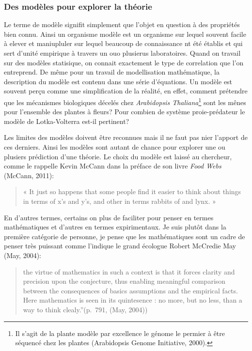 \subsubsection*{Des modèles pour explorer la
théorie}\label{des-moduxe8les-pour-explorer-la-thuxe9orie}

Le terme de modèle signifit simplement que l'objet en question à des
propriétés bien connu. Ainsi un organisme modèle est un organisme sur
lequel souvent facile à elever et maniupluler sur lequel beaucoup de
connaissance nt été établis et qui sert d'unité empirique à travers un
ouo plusierus laboratoires. Quand on travail sur des modèles statisique,
on connait exactement le type de correlation que l'on entreprend. De
même pour un travail de modellisation mathématique, la description du
modèle est contenu dans une série d'équations. Un modèle est souvent
perçu comme une simplification de la réalité, en effet, comment
prétendre que les mécanismes biologiques décelés chez \emph{Arabidopsis
Thaliana}\footnote{Il s'agit de la plante modèle par excellence le
  génome le permier à être séquencé chez les plantes (Arabidopsis Genome
  Initiative, 2000).} sont les mênes pour l'ensemble des plantes à
fleurs? Pour combien de système proie-prédateur le modèle de
Lotka-Volterra est-il pertinent?

Les limites des modèles doivent être reconnues mais il ne faut pas nier
l'apport de ces derniers. Ainsi les modèles sont autant de chance pour
explorer une ou plusiers prédiction d'une théorie. Le choix du modèle
est laissé au chercheur, comme le rappelle Kevin McCann dans la préface
de son livre \emph{Food Webs} (McCann, 2011):

\begin{quote}
« It just so happens that some people find it easier to think about
things in terms of x's and y's, and other in terms rabbits of and lynx.
»
\end{quote}

En d'autres termes, certains on plus de faciliter pour penser en termes
mathématiques et d'autres en termes expirimentaux. Je suis plutôt dans
la première catégorie de personne, je pense que les mathématiques sont
un cadre de penser très puissant comme l'indique le grand écologue
Robert McCredie May (May, 2004):

\begin{quote}
the virtue of mathematics in such a context is that it forces clarity
and precision upon the conjecture, thus enabling meaningful comparison
between the consequences of basics assumptions and the empirical facts.
Here mathematics is seen in its quintesence : no more, but no less, than
a way to think clealy.''(p.~791, (May, 2004))
\end{quote}

